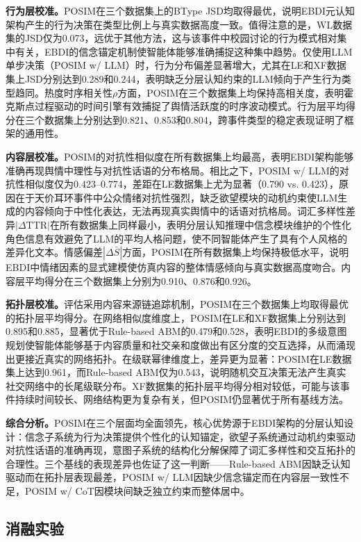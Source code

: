 \documentclass[a4paper,fleqn]{cas-sc}
\begin{document}
\textbf{行为层校准。}POSIM在三个数据集上的BType JSD均取得最优，说明EBDI元认知架构产生的行为决策在类型比例上与真实数据高度一致。值得注意的是，WL数据集的JSD仅为0.073，远优于其他方法，这与该事件中校园讨论的行为模式相对集中有关，EBDI的信念锚定机制使智能体能够准确捕捉这种集中趋势。仅使用LLM单步决策（POSIM w/ LLM）时，行为分布偏差显著增大，尤其在LE和XF数据集上JSD分别达到0.289和0.244，表明缺乏分层认知约束的LLM倾向于产生行为类型趋同。热度时序相关性$\rho$方面，POSIM在三个数据集上均保持高相关度，表明霍克斯点过程驱动的时间引擎有效捕捉了舆情活跃度的时序波动模式。行为层平均得分在三个数据集上分别达到0.821、0.853和0.804，跨事件类型的稳定表现证明了框架的通用性。

\textbf{内容层校准。}POSIM的对抗性相似度在所有数据集上均最高，表明EBDI架构能够准确再现舆情中理性与对抗性话语的分布格局。相比之下，POSIM w/ LLM的对抗性相似度仅为0.423--0.774，差距在LE数据集上尤为显著（0.790 vs. 0.423），原因在于天价耳环事件中公众情绪对抗性强烈，缺乏欲望模块的动机约束使LLM生成的内容倾向于中性化表达，无法再现真实舆情中的话语对抗格局。词汇多样性差异$|\Delta\text{TTR}|$在所有数据集上同样最小，表明分层认知推理中信念模块维护的个性化角色信息有效避免了LLM的平均人格问题，使不同智能体产生了具有个人风格的差异化文本。情感偏差$|\Delta\bar{S}|$方面，POSIM在所有数据集上均保持极低水平，说明EBDI中情绪因素的显式建模使仿真内容的整体情感倾向与真实数据高度吻合。内容层平均得分在三个数据集上分别为0.910、0.876和0.926。

\textbf{拓扑层校准。}评估采用内容来源链追踪机制，POSIM在三个数据集上均取得最优的拓扑层平均得分。在网络相似度维度上，POSIM在LE和XF数据集上分别达到0.895和0.885，显著优于Rule-based ABM的0.479和0.528，表明EBDI的多级意图规划使智能体能够基于内容质量和社交亲和度做出有区分度的交互选择，从而涌现出更接近真实的网络拓扑。在级联幂律维度上，差异更为显著：POSIM在LE数据集上达到0.961，而Rule-based ABM仅为0.543，说明随机交互决策无法产生真实社交网络中的长尾级联分布。XF数据集的拓扑层平均得分相对较低，可能与该事件持续时间较长、网络结构更为复杂有关，但POSIM仍显著优于所有基线方法。

\textbf{综合分析。}POSIM在三个层面均全面领先，核心优势源于EBDI架构的分层认知设计：信念子系统为行为决策提供个性化的认知锚定，欲望子系统通过动机约束驱动对抗性话语的准确再现，意图子系统的结构化分解保障了词汇多样性和交互拓扑的合理性。三个基线的表现差异也佐证了这一判断——Rule-based ABM因缺乏认知驱动而在拓扑层表现最差，POSIM w/ LLM因缺少信念锚定而在内容层一致性不足，POSIM w/ CoT因模块间缺乏独立约束而整体居中。

\vspace{6pt}
\subsection{消融实验}
\end{document}
